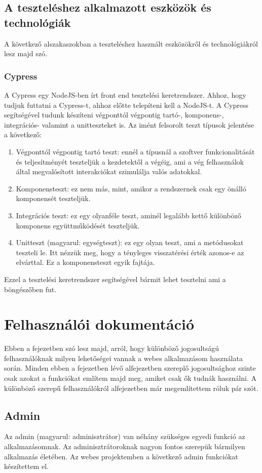 \documentclass[]{thesis-ekf}
\theoremstyle{definition}
\theoremstyle{remark}
\begin{document}
	\section{A teszteléshez alkalmazott eszközök és technológiák}
			A következő alszakaszokban a teszteléshez használt eszközökről és technológiákról lesz majd szó.
	\subsection{Cypress}
		A Cypress egy NodeJS-ben írt front end tesztelési keretrendszer. Ahhoz, hogy tudjuk futtatni a Cypress-t, ahhoz előtte telepíteni kell a NodeJS-t. A Cypress segítségével tudunk készíteni végponttól végpontig tartó-, komponens-, integrációs- valamint a unitteszteket is.
		Az imént felsorolt teszt típusok jelentése a következő:
		\begin{enumerate}
			\item Végponttól végpontig tartó teszt: ennél a típusnál a szoftver funkcionalitását és teljesítményét teszteljük a kezdetektől a végéig, ami a vég felhasználok által megvalósított interakciókat szimulálja valós adatokkal.
			\item Komponensteszt: ez nem más, mint, amikor a rendszernek csak egy önálló komponensét teszteljük.
			\item Integrációs teszt: ez egy olyanféle teszt, aminél legalább kettő különböző komponens együttműködését teszteljük.
			\item Unitteszt (magyarul: egységteszt): ez egy olyan teszt, ami a metódusokat teszteli le. Itt nézzük meg, hogy a tényleges visszatérési érték azonos-e az elvárttal. Ez a komponensteszt egyik fajtája.
		\end{enumerate}
		Ezzel a tesztelési keretrendszer segítségével bármit lehet tesztelni ami a böngészőben fut.
		\cite{Cypress, Kusper Szoftvertesztles, Katalon}
		
	\chapter{Felhasználói dokumentáció}
		Ebben a fejezetben szó lesz majd, arról, hogy különböző jogosultságú felhasználóknak milyen lehetőségei vannak a webes alkalmazásom használata során. Minden ebben a fejezetben lévő alfejezetben szereplő jogosultsághoz szinte csak azokat a funkciókat említem majd meg, amiket csak ők tudnák használni. A különböző szerepű felhasználókról \az{\ref{sc-plantuml}} alfejezetben már megemlítettem róluk pár szót.
	\section{Admin}
	Az admin (magyarul: adminisztrátor) van néhány szükséges egyedi funkció az alkalmazásomnak. Az adminisztrátoroknak nagyon fontos szerepük bármilyen alkalmazás életében. Az webes projektemben a következő admin funkciókat készítettem el.
\end{document}
